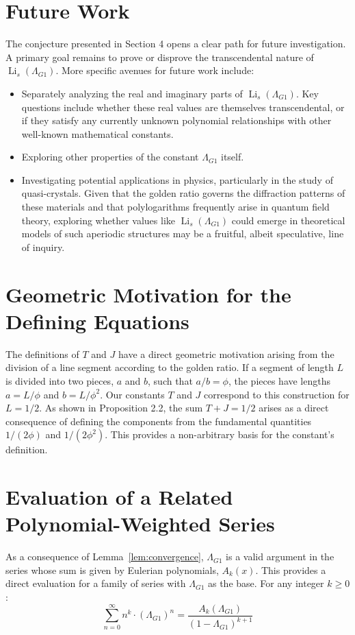 \documentclass{amsart}
\theoremstyle{plain}
\theoremstyle{definition}
\theoremstyle{remark}
\DeclareMathOperator{\Li}{Li} %
\newcommand{\LambdaG}{\Lambda_{G1}}
\newcommand{\phiG}{\phi}
\begin{document}
\section{Future Work}
The conjecture presented in Section 4 opens a clear path for future investigation. A primary goal remains to prove or disprove the transcendental nature of $\Li_s(\LambdaG)$. More specific avenues for future work include:
\begin{itemize}
    \item Separately analyzing the real and imaginary parts of $\Li_s(\LambdaG)$. Key questions include whether these real values are themselves transcendental, or if they satisfy any currently unknown polynomial relationships with other well-known mathematical constants.
    \item Exploring other properties of the constant $\LambdaG$ itself.
    \item Investigating potential applications in physics, particularly in the study of quasi-crystals. Given that the golden ratio governs the diffraction patterns of these materials and that polylogarithms frequently arise in quantum field theory, exploring whether values like $\Li_s(\LambdaG)$ could emerge in theoretical models of such aperiodic structures may be a fruitful, albeit speculative, line of inquiry.
\end{itemize}

\appendix
\section{Geometric Motivation for the Defining Equations}
The definitions of $T$ and $J$ have a direct geometric motivation arising from the division of a line segment according to the golden ratio. If a segment of length $L$ is divided into two pieces, $a$ and $b$, such that $a/b = \phiG$, the pieces have lengths $a=L/\phiG$ and $b=L/\phiG^2$. Our constants $T$ and $J$ correspond to this construction for $L=1/2$. As shown in Proposition 2.2, the sum $T+J=1/2$ arises as a direct consequence of defining the components from the fundamental quantities $1/(2\phiG)$ and $1/(2\phiG^2)$. This provides a non-arbitrary basis for the constant's definition.

\section{Evaluation of a Related Polynomial-Weighted Series}
As a consequence of Lemma~\ref{lem:convergence}, $\LambdaG$ is a valid argument in the series whose sum is given by Eulerian polynomials, $A_k(x)$. This provides a direct evaluation for a family of series with $\LambdaG$ as the base. For any integer $k \ge 0$:
$$ \sum_{n=0}^{\infty} n^k \cdot (\LambdaG)^n = \frac{A_k(\LambdaG)}{(1-\LambdaG)^{k+1}} $$
\end{document}
